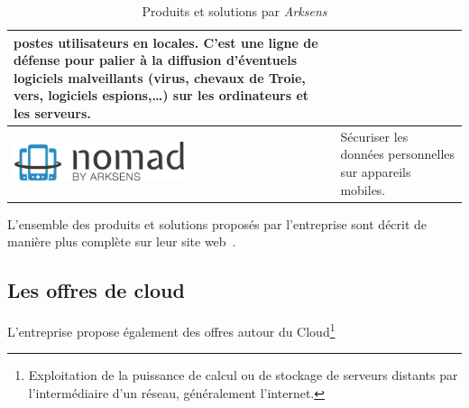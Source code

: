 \documentclass[a4paper,10pt, twoside]{report}
\begin{document}
\begin{spacing}{1.2}
\begin{table}[h!]
\begin{tabular}{m{6cm}m{6cm}}
    postes utilisateurs en locales. C'est une ligne de d\'efense pour palier
    \`a la diffusion d'\'eventuels logiciels malveillants (virus, chevaux de
    Troie, vers, logiciels espions,\ldots{}) sur les ordinateurs et les
    serveurs.\\
    \hline
    \includegraphics[width=5cm, fbox]{produits/nomad.png} & S\'ecuriser les
    donn\'ees personnelles sur appareils mobiles.\\
    \hline
  \end{tabular}
  \caption{\label{tabProduits} Produits et solutions par \textit{Arksens}}
\end{table}

L'ensemble des produits et solutions propos\'es par l'entreprise sont d\'ecrit
de mani\`ere plus compl\`ete sur leur site web~\cite{refArksens}.

\subsection{Les offres de cloud}
L'entreprise propose \'egalement des offres autour du Cloud\footnote{
Exploitation de la puissance de calcul ou de stockage de serveurs distants
par l'interm\'ediaire d'un r\'eseau, g\'en\'eralement l'internet.}


\end{spacing}
\end{document}

